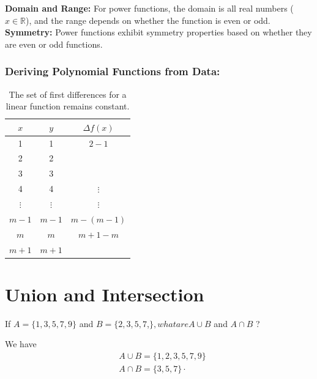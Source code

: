 \documentclass{article}
\begin{document}
\textbf{Domain and Range:} 
For power functions, the domain is all real numbers ($x \in \mathbb{R}$), and the range depends on whether the function is even or odd.\\
\textbf{Symmetry:} Power functions exhibit symmetry properties based on whether they are even or odd functions. 

\subsubsection{Deriving Polynomial Functions from Data:}

\begin{table}[h]
    \centering
    \begin{tabular}{|c|c|c|}
    \hline
        \rowcolor[HTML]{EFEFEF}
        $x$ & $y$ & $\Delta f(x)$ \\
        \hline
        1 & 1 & $2-1$\\
        \hline
        2 & 2 & \\
        \hline
        3 & 3 & \\
        \hline
        4 & 4 & $\vdots$ \\
        \hline
        $\vdots$ & $\vdots$ & $\vdots$\\
        \hline
        $m-1$ & $m-1$ & $m-(m-1)$\\
        \hline
        $m$ & $m$ & $m+1-m$\\
        \hline
        $m+1$ & $m+1$ & \\
        \hline
    \end{tabular}
    \caption*{The set of first differences for a linear function remains constant.}
\end{table}

\newpage
\section*{Union and Intersection}
If $A=\{1,3,5,7,9\}$ and $B=\{2,3,5,7$,$\} , what are A \cup B$ and $A \cap B$ ?

We have
$$
\begin{aligned}
& A \cup B=\{1,2,3,5,7,9\} \\
& A \cap B=\{3,5,7\} \cdot 
\end{aligned}
$$


\def\firstcircle{(0,0) circle (1cm)}
\def\secondcircle{(0:1.5cm) circle (1cm)}

\end{document}

